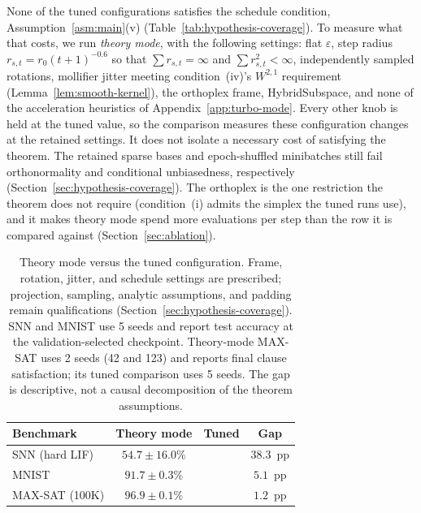 None of the tuned configurations satisfies the schedule condition,
Assumption~\ref{asm:main}(v) (Table~\ref{tab:hypothesis-coverage}). To measure what
that costs, we run \emph{theory mode}, with the following settings:
flat $\varepsilon$, step radius $r_{s,t} = r_0 (t+1)^{-0.6}$ so that
$\sum r_{s,t} = \infty$ and $\sum r_{s,t}^2 < \infty$, independently sampled
rotations, mollifier jitter meeting condition~(iv)'s $W^{2,1}$ requirement
(Lemma~\ref{lem:smooth-kernel}), the orthoplex
frame, HybridSubspace, and none of the acceleration heuristics of
Appendix~\ref{app:turbo-mode}. Every other knob is held at the tuned value, so the
comparison measures these configuration changes at the retained settings. It does
not isolate a necessary cost of satisfying the theorem. The retained sparse
bases and epoch-shuffled minibatches still fail orthonormality and conditional
unbiasedness, respectively (Section~\ref{sec:hypothesis-coverage}).
The orthoplex is the one restriction the theorem does not require (condition~(i)
admits the simplex the tuned runs use), and it makes theory mode spend more
evaluations per step than the row it is compared against (Section~\ref{sec:ablation}).

\begin{table}[t]
\centering
\caption{Theory mode versus the tuned configuration. Frame, rotation, jitter, and schedule settings are prescribed; projection, sampling, analytic assumptions, and padding remain qualifications (Section~\ref{sec:hypothesis-coverage}). SNN and MNIST use 5 seeds and report test accuracy at the validation-selected checkpoint. Theory-mode MAX-SAT uses 2 seeds (42 and 123) and reports final clause satisfaction; its tuned comparison uses 5 seeds. The gap is descriptive, not a causal decomposition of the theorem assumptions.}
\label{tab:theory-mode}
\small
\begin{tabular}{@{}lccc@{}}
\toprule
Benchmark & Theory mode & Tuned & Gap \\
\midrule
SNN (hard LIF) & $54.7 \pm 16.0$\% & \snnBestAcc{} & $38.3$~pp \\
MNIST          & $91.7 \pm 0.3$\% & \mnistBestAcc{} & $5.1$~pp \\
MAX-SAT (100K) & $96.9 \pm 0.1$\% & \maxsatHundredKAcc{} & $1.2$~pp \\
\bottomrule
\end{tabular}
\end{table}

